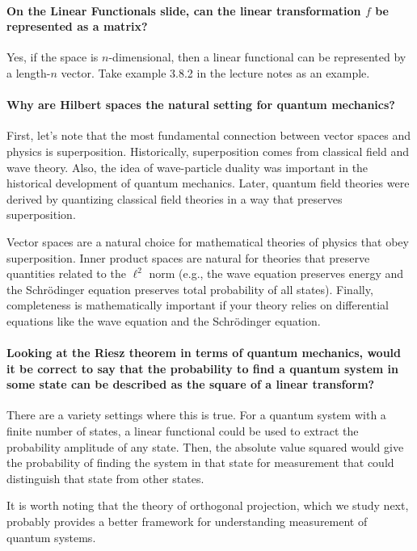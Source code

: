 \documentclass[10pt,english]{article}
\begin{document}
\paragraph{On the Linear Functionals slide, can the linear transformation $f$ be represented as a matrix?} Yes, if the space is $n$-dimensional, then a linear functional can be represented by a length-$n$ vector. Take example 3.8.2 in the lecture notes as an example.

\paragraph{Why are Hilbert spaces the natural setting for quantum mechanics?}

First, let's note that the most fundamental connection between vector spaces and physics is superposition.
Historically, superposition comes from classical field and wave theory.
Also, the idea of wave-particle duality was important in the historical development of quantum mechanics.
Later, quantum field theories were derived by quantizing classical field theories in a way that preserves superposition.

Vector spaces are a natural choice for mathematical theories of physics that obey superposition.
Inner product spaces are natural for theories that preserve quantities related to the $\ell^2$ norm (e.g., the wave equation preserves energy and the Schr\"{o}dinger equation preserves total probability of all states).
Finally, completeness is mathematically important if your theory relies on differential equations like the wave equation and the Schr\"{o}dinger equation.


\paragraph{Looking at the Riesz theorem in terms of quantum mechanics, would it be correct to say that the probability to find a quantum system in some state can be described as the square of a linear transform?}

There are a variety settings where this is true.
For a quantum system with a finite number of states, a linear functional could be used to extract the probability amplitude of any state.  Then, the absolute value squared would give the probability of finding the system in that state for measurement that could distinguish that state from other states.

It is worth noting that the theory of orthogonal projection, which we study next, probably provides a better framework for understanding measurement of quantum systems.
\end{document}
